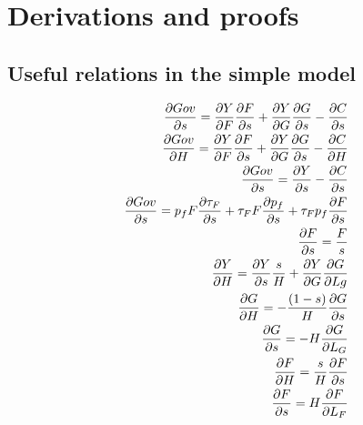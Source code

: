 \clearpage
\appendix
\section{Derivations and proofs}\label{app:derivations}

\subsection{Useful relations in the simple model}\label{app:dervs_use}
\begin{align*}
\frac{\partial Gov}{\partial s}=\frac{\partial Y}{\partial F}\frac{\partial F}{\partial s}+\frac{\partial Y}{\partial G}\frac{\partial G}{\partial s}-\frac{\partial C}{\partial s}\\
\frac{\partial Gov}{\partial H}=\frac{\partial Y}{\partial F}\frac{\partial F}{\partial s}+\frac{\partial Y}{\partial G}\frac{\partial G}{\partial s}-\frac{\partial C}{\partial H}\\
\frac{\partial Gov}{\partial s}=\frac{\partial Y}{\partial s}-\frac{\partial C}{\partial s}\\
\frac{\partial Gov}{\partial s}=p_f F \frac{\partial \tau_F}{\partial s}+\tau_F F \frac{\partial p_f}{\partial s}+\tau_F p_f \frac{\partial F}{\partial s}\\
\frac{\partial F}{\partial s}=\frac{F}{s}
\\
\frac{\partial{Y}}{\partial{H}}= \frac{\partial{Y}}{\partial{s}}\frac{s}{H}+\frac{\partial{Y}}{\partial{G}}\frac{\partial{G}}{\partial{Lg}}
\\
\frac{\partial{G}}{\partial{H}}=-\frac{(1-s)}{H}\frac{\partial{G}}{\partial{s}}
\\\frac{\partial{G}}{\partial{s}}=-H\frac{\partial{G}}{\partial{L_G}}\\
\frac{\partial{F}}{\partial{H}}=\frac{s}{H}\frac{\partial{F}}{\partial{s}}\\
\frac{\partial{F}}{\partial{s}}=H\frac{\partial{F}}{\partial{L_F}}
\end{align*}

